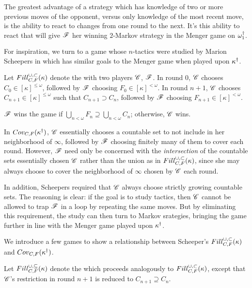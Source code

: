 The greatest advantage of a strategy which has knowledge of two or more previous
moves of the opponent, versus only knowledge of the most recent move, is the
ability to react to changes from one round to the next. It's this ability to
react that will give $\mathscr{F}$ her winning $2$-Markov strategy in the Menger
game on $\omega^\dagger_1$.

For inspiration, we turn to a game whose $n$-tactics were studied by Marion
Scheepers in \cite{MR1129143} which has similar goals to the Menger game when
played upon $\kappa^\dagger$.

\begin{game}
  Let $Fill^{\cup,\subset}_{C,F}(\kappa)$ denote the 
  with two players $\mathscr{C}$, $\mathscr{F}$. In round $0$, $\mathscr{C}$ chooses
  $C_0\in[\kappa]^{\leq\omega}$, followed by $\mathscr{F}$ choosing
  $F_0\in[\kappa]^{<\omega}$. In round $n+1$, $\mathscr{C}$ chooses
  $C_{n+1}\in[\kappa]^{\leq\omega}$ such that $C_{n+1}\supset C_n$, followed
  by $\mathscr{F}$ choosing $F_{n+1}\in[\kappa]^{<\omega}$.

  $\mathscr{F}$ wins the game if
  $\bigcup_{n<\omega} F_n\supseteq\bigcup_{n<\omega} C_n$; otherwise, $\mathscr{C}$
  wins.
\end{game}

In $Cov_{C,F}(\kappa^\dagger)$, $\mathscr{C}$ essentially chooses a countable set
to not include in her neighborhood of $\infty$, followed by $\mathscr{F}$ choosing
finitely many of them to cover each round. However,
$\mathscr{F}$ need only be concerned with the \textit{intersection} of the
countable sets essentially chosen $\mathscr{C}$ rather than the union as in
$Fill^{\cup,\subset}_{C,F}(\kappa)$, since she may always choose to cover the neighborhood of
$\infty$ chosen by $\mathscr{C}$ each round.

In addition, Scheepers required that $\mathscr{C}$ always choose strictly growing
countable sets. The reasoning is clear: if the goal is to study tactics, then
$\mathscr{C}$ cannot be allowed to trap $\mathscr{F}$ in a loop by repeating the same moves.
But by eliminating this requirement, the study can then turn to Markov
srategies, bringing the game further in line with the Menger game played upon
$\kappa^\dagger$.

We introduce a few games to show a relationship between Scheeper's
$Fill^{\cup,\subset}_{C,F}(\kappa)$ and $Cov_{C,F}(\kappa^\dagger)$.

\begin{game}
  Let $Fill^{\cup,\subseteq}_{C,F}(\kappa)$ denote the
   which proceeds analogously
  to $Fill^{\cup,\subset}_{C,F}(\kappa)$, except that $\mathscr{C}$'s restriction in round $n+1$
  is reduced to $C_{n+1}\supseteq C_n$.
\end{game}

